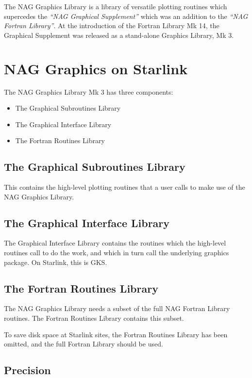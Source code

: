 The NAG Graphics Library is a library of versatile plotting
routines which supercedes the {\em ``NAG Graphical Supplement''\/} which was an 
addition to the {\em ``NAG Fortran Library''\/}. 
At the introduction of the Fortran Library Mk 14, the Graphical 
Supplement was released as a stand-alone Graphics Library, Mk 3.

\section{NAG Graphics on Starlink}

The  NAG Graphics Library Mk 3 has three components:
\begin{itemize}
\item The Graphical Subroutines Library
\item The Graphical Interface Library
\item The Fortran Routines Library
\end{itemize}

\subsection{The Graphical Subroutines Library}

This contains the high-level plotting routines that a
user calls to make use of the NAG Graphics Library.

\subsection{The Graphical Interface Library}

The Graphical Interface Library contains the routines which the high-level
routines call to do the work, and which in turn call the underlying graphics
package. On Starlink, this is GKS.

\subsection{The Fortran Routines Library}

The NAG Graphics Library needs a subset of the full NAG Fortran Library
routines. The Fortran Routines Library contains this subset. 

To save disk space at Starlink sites, the Fortran Routines Library has been
omitted, and the full Fortran Library should be used.

\subsection{Precision}

